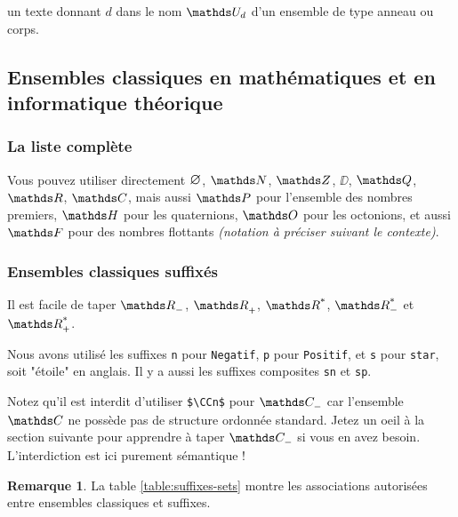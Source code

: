 \documentclass[12pt,a4paper]{article}
\theoremstyle{definition}
\newtheorem*{remark}{Remarque}
\begin{document}
 un texte donnant $d$ dans le nom $\setalge*{U}{d}$ d'un ensemble de type anneau ou corps.



\subsection{Ensembles classiques en mathématiques et en informatique théorique} 

\subsubsection{La liste complète}

\begin{tcblisting}{}
Vous pouvez utiliser directement $\nullset$, $\NN$, $\ZZ$, $\DD$, $\QQ$, $\RR$, $\CC$,
mais aussi $\PP$ pour l'ensemble des nombres premiers, $\HH$ pour les quaternions,
$\OO$ pour les octonions, et aussi $\FF$ pour des nombres flottants \emph{(notation à 
préciser suivant le contexte)}.
\end{tcblisting}



\subsubsection{Ensembles classiques suffixés}

\begin{tcblisting}{}
Il est facile de taper $\RRn$, $\RRp$, $\RRs$, $\RRsn$ et $\RRsp$.
\end{tcblisting}


Nous avons utilisé les suffixes \verb+n+ pour \verb+Negatif+, \verb+p+ pour \verb+Positif+, et \verb+s+ pour \verb+star+, soit "étoile" en anglais. Il y a aussi les suffixes composites \verb+sn+ et \verb+sp+.

\medskip

Notez qu'il est interdit d'utiliser \verb+$\CCn$+ pour $\setspecial{\CC}{n}$ car l'ensemble $\CC$ ne possède pas de structure ordonnée standard. Jetez un oeil à la section suivante pour apprendre à taper $\setspecial{\CC}{n}$ si vous en avez besoin. L'interdiction est ici purement sémantique !

\medskip

\begin{remark}
	La table \ref{table:suffixes-sets}  montre les associations autorisées entre ensembles classiques et suffixes.
\end{remark}
\end{document}
